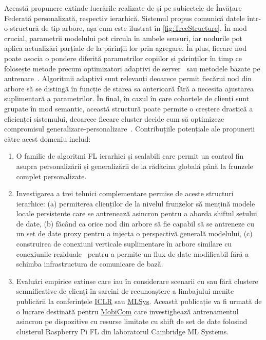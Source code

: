 Această propunere extinde lucrările realizate de \citet{EuroMLSysWorkshop} și \citet{OperaWorkshop} pe subiectele de Învățare Federată personalizată, respectiv ierarhică. Sistemul propus comunică datele într-o structură de tip arbore, așa cum este ilustrat în \cref{fig:TreeStructure}. În mod crucial, parametrii modelului pot circula în ambele sensuri, iar nodurile pot aplica actualizări parțiale de la părinții lor prin agregare. În plus, fiecare nod poate asocia o pondere diferită parametrilor copiilor și părinților în timp ce folosește metode precum optimizatori adaptivi de server~\citep{FedOPT} sau metodele bazate pe antrenare~\citep{Ditto,EWC,DeepMutualLearning}. Algoritmii adaptivi sunt relevanți deoarece permit fiecărui nod din arbore să se distingă în funcție de starea sa anterioară fără a necesita ajustarea suplimentară a parametrilor. În final, în cazul în care cohortele de clienți sunt grupate în mod semantic, această structură poate permite o creștere drastică a eficienței sistemului, deoarece fiecare cluster decide cum să optimizeze compromisul generalizare-personalizare~\citep{PersonalisationGeneralisationTradeoff}. Contribuțiile potențiale ale propunerii către acest domeniu includ:
\begin{enumerate}
    \item O familie de algoritmi FL ierarhici și scalabili care permit un control fin asupra personalizării și generalizării de la rădăcina globală până la frunzele complet personalizate.
    \item Investigarea a trei tehnici complementare permise de aceste structuri ierarhice: (a) permiterea clienților de la nivelul frunzelor să mențină modele locale persistente care se antrenează asincron pentru a aborda shiftul setului de date, (b) făcând ca orice nod din arbore să fie capabil să se antreneze cu un set de date proxy pentru a injecta o perspectivă generală modelului, (c) construirea de conexiuni verticale suplimentare în arbore similare cu conexiunile reziduale~\citep{ResNet} pentru a permite un flux de date modificabil fără a schimba infrastructura de comunicare de bază.
    \item Evaluări empirice extinse care iau în considerare scenarii cu sau fără clustere semnificative de clienți în sarcini de recunoaștere a limbajului menite publicării la conferințele \href{https://iclr.cc/}{ICLR} sau \href{https://mlsys.org/}{MLSys}. Această publicație va fi urmată de o lucrare destinată pentru \href{https://sigmobile.org/mobicom/2023/}{MobiCom} care investighează antrenamentul asincron pe dispozitive cu resurse limitate cu shift de set de date folosind clusterul Raspberry Pi FL din laboratorul Cambridge ML Systems.
\end{enumerate}
